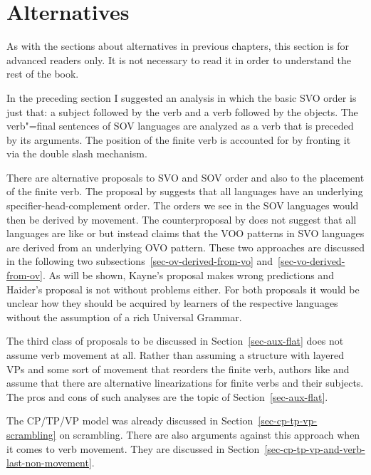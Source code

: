 \section{Alternatives}

As with the sections about alternatives in previous chapters, this section is for advanced readers
only. It is not necessary to read it in order to understand the rest of the book.

In the preceding section I suggested an analysis in which the basic SVO order is just that: a
subject followed by the verb and a verb followed by the objects. The verb"=final sentences of SOV
languages are analyzed as a verb that is preceded by its arguments. The position of the finite verb
is accounted for by fronting it via the double slash mechanism.

\largerpage[1]
There are alternative proposals to SVO and SOV order and also to the placement of the finite
verb. The proposal by \citet{Kayne94a-u} suggests that all languages have an underlying
specifier-head-complement order. The orders we see in the  SOV languages would then be
derived by movement. The counterproposal by \citet{Haider2000a,Haider2020a} does not suggest that all languages are
like  or  but instead claims that the VOO patterns in SVO languages are
derived from an underlying OVO pattern. These two approaches are discussed in the following two subsections~\ref{sec-ov-derived-from-vo} and~\ref{sec-vo-derived-from-ov}. As will be shown,
Kayne's proposal
makes wrong predictions and Haider's proposal is not without problems either. For
both proposals it would be unclear how they should be acquired by learners of the respective
languages without the assumption of a rich Universal Grammar.

The third class of proposals to be discussed in Section~\ref{sec-aux-flat} does not assume verb movement at
all. Rather than assuming a structure with layered VPs and some sort of movement that reorders the
finite verb, authors like \citet*{GKPS85a} and \citet{Sag2020a} assume that there are alternative
linearizations for finite verbs and their subjects. The pros and cons of such analyses are the topic
of Section~\ref{sec-aux-flat}.

The CP/TP/VP model was already discussed in Section~\ref{sec-cp-tp-vp-scrambling} on scrambling. 
There are also arguments against this approach when it comes to verb movement. They are discussed in
Section~\ref{sec-cp-tp-vp-and-verb-last-non-movement}.  

